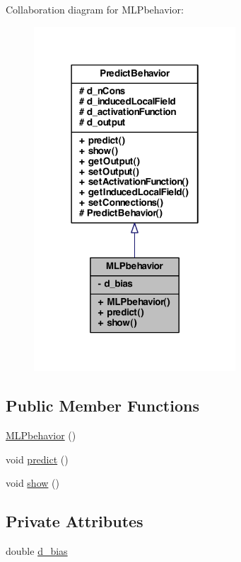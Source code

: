 Collaboration diagram for MLPbehavior:
\nopagebreak
\begin{figure}[H]
\begin{center}
\leavevmode
\includegraphics[width=214pt]{class_m_l_pbehavior__coll__graph}
\end{center}
\end{figure}
\subsection*{Public Member Functions}
\begin{DoxyCompactItemize}
\item 
\hyperlink{class_m_l_pbehavior_a6e293c81badafe79f5c736aab2b7d58d}{MLPbehavior} ()
\item 
void \hyperlink{class_m_l_pbehavior_aaff94adc3577cda9e48d8da925b0ffbf}{predict} ()
\item 
void \hyperlink{class_m_l_pbehavior_a32aa885e07e8f4eb33e05afb46040567}{show} ()
\end{DoxyCompactItemize}
\subsection*{Private Attributes}
\begin{DoxyCompactItemize}
\item 
double \hyperlink{class_m_l_pbehavior_a6206785c5c3f838a0538f9f77fa7a25a}{d\_\-bias}
\end{DoxyCompactItemize}

